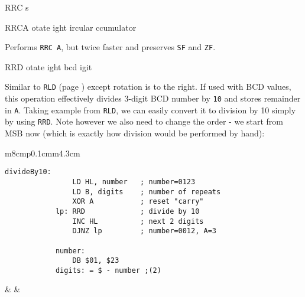 \begin{basedescript}{
    \desclabelstyle{\multilinelabel}
    \desclabelwidth{3cm}}
\begin{DetailItem}{RRC s}
    \end{DetailItem}

    \begin{DetailItem}{RRCA}
        {otate ight ircular ccumulator}
        {}

        Performs {\tt RRC A}, but twice faster and preserves {\tt SF} and {\tt ZF}.

        \begin{DetailEffects}
            \FlagsRRCA
        \end{DetailEffects}
						
        \begin{DetailTiming}
        \end{DetailTiming}

    \end{DetailItem}

    \begin{DetailItem}{RRD}
        {otate ight bcd igit}
        {\SymRRD}
		
        Similar to {\tt RLD} (page \pageref{DetailRefRLD}) except rotation is to the right. If used with BCD values, this operation effectively divides 3-digit BCD number by {\tt 10} and stores remainder in {\tt A}. Taking example from {\tt RLD}, we can easily convert it to division by 10 simply by using {\tt RRD}. Note however we also need to change the order - we start from MSB now (which is exactly how division would be performed by hand):

        \begin{tabular}{m{8cm}p{0.1cm}m{4.3cm}}

            \begin{lstlisting}[autogobble=true, belowskip=0pt]
            divideBy10:
                LD HL, number	; number=0123
                LD B, digits	; number of repeats
                XOR A			; reset "carry"
            lp:	RRD				; divide by 10 
                INC HL			; next 2 digits
                DJNZ lp			; number=0012, A=3

            number:
                DB $01, $23
            digits: = $ - number ;(2)
            \end{lstlisting}
	
            & &
   	
            \newcommand{\HLindicator}[2]{
                \path (progress-#1-2.south west) --
                    node[xshift=#2, yshift=1.4ex, rotate=90]{$\lbrace$}
                    node[xshift=#2 + 0.1ex, yshift=0.2ex, indicator]{(HL)} (progress-#1-2.south)
            }


\end{tabular}
\end{DetailItem}
\end{basedescript}
